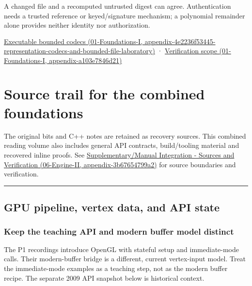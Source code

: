 A changed file and a recomputed untrusted digest can agree. Authentication needs a trusted reference or keyed/signature mechanism; a polynomial remainder alone provides neither identity nor authorization.

\href{../01-Foundations-I/main.pdf\#nameddest=appendix-4e2236f53445-representation-codecs-and-bounded-file-laboratory}{Executable bounded codecs (01-Foundations-I, appendix-4e2236f53445-representation-codecs-and-bounded-file-laboratory)} · \href{../01-Foundations-I/main.pdf\#nameddest=appendix-a103e7846d21}{Verification scope (01-Foundations-I, appendix-a103e7846d21)}

\section{Source trail for the combined foundations}\label{03-visual-computing-i-ch018-source-trail-for-the-combined-foundations}

The original bits and C++ notes are retained as recovery sources. This combined reading volume also includes general API contracts, build/tooling material and recovered inline proofs. See \href{../06-Engine-II/main.pdf\#nameddest=appendix-3b67654799a2}{Supplementary/Manual Integration - Sources and Verification (06-Engine-II, appendix-3b67654799a2)} for source boundaries and verification.

\begin{center}\rule{0.5\linewidth}{0.5pt}\end{center}

\subsection{GPU pipeline, vertex data, and API state}\label{03-visual-computing-i-ch018-gpu-pipeline-vertex-data-and-api-state}

\subsubsection{Keep the teaching API and modern buffer model distinct}\label{03-visual-computing-i-ch018-keep-the-teaching-api-and-modern-buffer-model-distinct}

The P1 recordings introduce OpenGL with stateful setup and immediate-mode calls. Their modern-buffer bridge is a different, current vertex-input model. Treat the immediate-mode examples as a teaching step, not as the modern buffer recipe. The separate 2009 API snapshot below is historical context.

